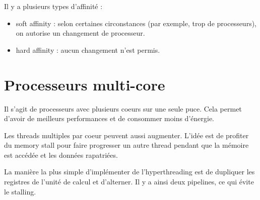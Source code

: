 
Il y a plusieurs types d'affinité :

\begin{itemize}
	\item soft affinity : selon certaines circonstances (par exemple, trop de processeurs), on autorise un changement de processeur.
	\item hard affinity : aucun changement n'est permis.
\end{itemize}

\section{Processeurs multi-core}

Il s'agit de processeurs avec plusieurs coeurs sur une seule puce. Cela permet d'avoir de meilleurs performances et de consommer moins d'énergie.

Les threads multiples par coeur peuvent aussi augmenter. L'idée est de profiter du memory stall pour faire progresser un autre thread pendant que la mémoire est accédée et les données rapatriées.

La manière la plus simple d'implémenter de l'hyperthreading est de dupliquer les registres de l'unité de calcul et d'alterner. Il y a ainsi deux pipelines, ce qui évite le stalling.